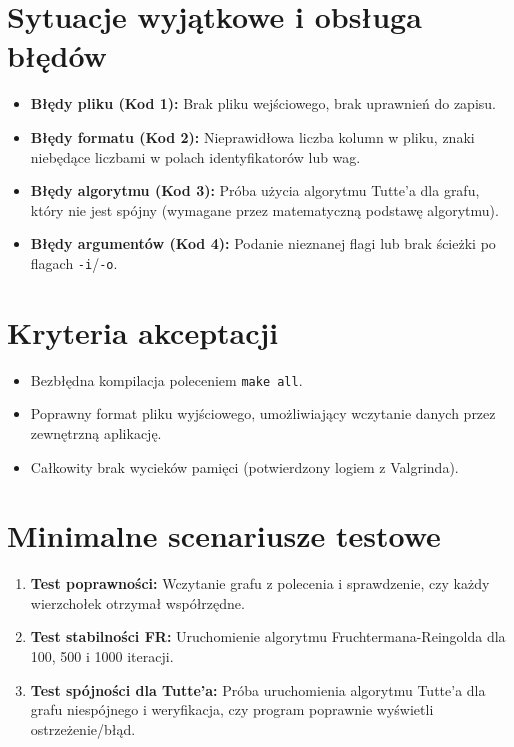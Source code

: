 \documentclass[12pt,a4paper]{article}
\begin{document}
\newpage
\section{Sytuacje wyjątkowe i obsługa błędów}
\begin{itemize}
    \item \textbf{Błędy pliku (Kod 1):} Brak pliku wejściowego, brak uprawnień do zapisu.
    \item \textbf{Błędy formatu (Kod 2):} Nieprawidłowa liczba kolumn w pliku, znaki niebędące liczbami w polach identyfikatorów lub wag.
    \item \textbf{Błędy algorytmu (Kod 3):} Próba użycia algorytmu Tutte'a dla grafu, który nie jest spójny (wymagane przez matematyczną podstawę algorytmu).
    \item \textbf{Błędy argumentów (Kod 4):} Podanie nieznanej flagi lub brak ścieżki po flagach \texttt{-i}/\texttt{-o}.
\end{itemize}

\section{Kryteria akceptacji}
\begin{itemize}
    \item Bezbłędna kompilacja poleceniem \texttt{make all}.
    \item Poprawny format pliku wyjściowego, umożliwiający wczytanie danych przez zewnętrzną aplikację.
    \item Całkowity brak wycieków pamięci (potwierdzony logiem z Valgrinda).
\end{itemize}

\section{Minimalne scenariusze testowe}
\begin{enumerate}
    \item \textbf{Test poprawności:} Wczytanie grafu z polecenia i sprawdzenie, czy każdy wierzchołek otrzymał współrzędne.
    \item \textbf{Test stabilności FR:} Uruchomienie algorytmu Fruchtermana-Reingolda dla 100, 500 i 1000 iteracji.
    \item \textbf{Test spójności dla Tutte'a:} Próba uruchomienia algorytmu Tutte'a dla grafu niespójnego i weryfikacja, czy program poprawnie wyświetli ostrzeżenie/błąd.

\end{enumerate}
\end{document}
